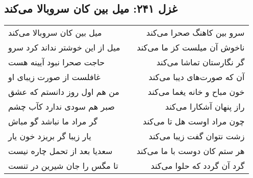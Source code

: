 \begin{center}
\section*{غزل ۲۴۱: میل بین کان سروبالا می‌کند}
\label{sec:241}
\begin{longtable}{l p{0.5cm} r}
میل بین کان سروبالا می‌کند
&&
سرو بین کاهنگ صحرا می‌کند
\\
میل از این خوشتر نداند کرد سرو
&&
ناخوش آن میلست کز ما می‌کند
\\
حاجت صحرا نبود آیینه هست
&&
گر نگارستان تماشا می‌کند
\\
غافلست از صورت زیبای او
&&
آن که صورت‌های دیبا می‌کند
\\
من هم اول روز دانستم که عشق
&&
خون مباح و خانه یغما می‌کند
\\
صبر هم سودی ندارد کآب چشم
&&
راز پنهان آشکارا می‌کند
\\
گر مراد ما نباشد گو مباش
&&
چون مراد اوست هل تا می‌کند
\\
یار زیبا گر بریزد خون یار
&&
زشت نتوان گفت زیبا می‌کند
\\
سعدیا بعد از تحمل چاره نیست
&&
هر ستم کان دوست با ما می‌کند
\\
تا مگس را جان شیرین در تنست
&&
گرد آن گردد که حلوا می‌کند
\\
\end{longtable}
\end{center}
